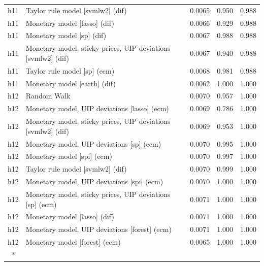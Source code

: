 \begin{ThreePartTable}
\begin{longtable}[t]{cp{5.5cm}ccc}
h11 & \raggedright Taylor rule model [svmlw2] (dif) & 0.0065 & 0.950 & 0.988\\
h11 & \raggedright Monetary model [lasso] (dif) & 0.0066 & 0.929 & 0.988\\
h11 & \raggedright Monetary model [sp] (dif) & 0.0067 & 0.988 & 0.988\\
h11 & \raggedright Monetary model, sticky prices, UIP deviations [svmlw2] (dif) & 0.0067 & 0.940 & 0.988\\
h11 & \raggedright Taylor rule model [sp] (ecm) & 0.0068 & 0.981 & 0.988\\
h11 & \raggedright Monetary model [earth] (dif) & 0.0062 & 1.000 & 1.000\\
\addlinespace
h12 & \raggedright Random Walk & 0.0070 & 0.957 & 1.000\\
h12 & \raggedright Monetary model, UIP deviations [lasso] (ecm) & 0.0069 & 0.786 & 1.000\\
h12 & \raggedright Monetary model, sticky prices, UIP deviations [svmlw2] (dif) & 0.0069 & 0.953 & 1.000\\
h12 & \raggedright Monetary model, UIP deviations [sp] (ecm) & 0.0070 & 0.995 & 1.000\\
h12 & \raggedright Monetary model [spi] (ecm) & 0.0070 & 0.997 & 1.000\\
h12 & \raggedright Taylor rule model [svmlw2] (dif) & 0.0070 & 0.999 & 1.000\\
h12 & \raggedright Monetary model, UIP deviations [spi] (ecm) & 0.0070 & 1.000 & 1.000\\
h12 & \raggedright Monetary model, sticky prices, UIP deviations [sp] (ecm) & 0.0071 & 1.000 & 1.000\\
h12 & \raggedright Monetary model [lasso] (dif) & 0.0071 & 1.000 & 1.000\\
h12 & \raggedright Monetary model, UIP deviations [forest] (ecm) & 0.0071 & 1.000 & 1.000\\
h12 & \raggedright Monetary model [forest] (ecm) & 0.0065 & 1.000 & 1.000\\*
\end{longtable}
\end{ThreePartTable}
\endgroup{}
